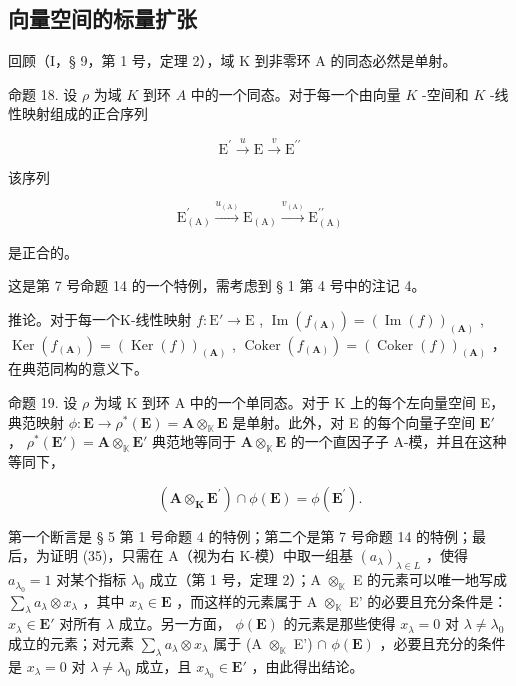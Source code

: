 \subsection{向量空间的标量扩张}

回顾（I，§ 9，第 1 号，定理 2），域 K 到非零环 A 的同态必然是单射。

命题 18. 设 \(\rho\) 为域 \(K\) 到环 \(A\) 中的一个同态。对于每一个由向量 \(K\) -空间和 \(K\) -线性映射组成的正合序列

\[
\mathrm{E} ^ {\prime} \xrightarrow {u} \mathrm{E} \xrightarrow {v} \mathrm{E} ^ {\prime \prime}
\]

该序列

\[
\mathrm{E} _ {(\mathrm{A})} ^ {\prime} \xrightarrow {u _ {(\mathrm{A})}} \mathrm{E} _ {(\mathrm{A})} \xrightarrow {v _ {(\mathrm{A})}} \mathrm{E} _ {(\mathrm{A})} ^ {\prime \prime}
\]

是正合的。

这是第 7 号命题 14 的一个特例，需考虑到 § 1 第 4 号中的注记 4。

推论。对于每一个K-线性映射 \(f: \mathrm{E}' \to \mathrm{E}\) , \(\operatorname{Im}(f_{(\mathbf{A})}) = (\operatorname{Im}(f))_{(\mathbf{A})}\) , \(\operatorname{Ker}(f_{(\mathbf{A})}) = (\operatorname{Ker}(f))_{(\mathbf{A})}\) , \(\operatorname{Coker}(f_{(\mathbf{A})}) = (\operatorname{Coker}(f))_{(\mathbf{A})}\) ，在典范同构的意义下。

命题 19. 设 \(\rho\) 为域 K 到环 A 中的一个单同态。对于 K 上的每个左向量空间 E，典范映射 \(\phi: \mathbf{E} \to \rho^{*}(\mathbf{E}) = \mathbf{A} \otimes_{\mathbb{K}} \mathbf{E}\) 是单射。此外，对 E 的每个向量子空间 \(\mathbf{E}'\) ， \(\rho^{*}(\mathbf{E}') = \mathbf{A} \otimes_{\mathbb{K}} \mathbf{E}'\) 典范地等同于 \(\mathbf{A} \otimes_{\mathbb{K}} \mathbf{E}\) 的一个直因子子 A-模，并且在这种等同下，

\[
(\mathbf {A} \otimes_ {\mathbf {K}} \mathbf {E} ^ {\prime}) \cap \phi (\mathbf {E}) = \phi (\mathbf {E} ^ {\prime}).\tag{35}
\]

第一个断言是 § 5 第 1 号命题 4 的特例；第二个是第 7 号命题 14 的特例；最后，为证明 (35)，只需在 A（视为右 K-模）中取一组基 \((a_{\lambda})_{\lambda \in L}\) ，使得 \(a_{\lambda_0} = 1\) 对某个指标 \(\lambda_0\) 成立（第 1 号，定理 2）；A \(\otimes_{\mathbb{K}}\) E 的元素可以唯一地写成 \(\sum_{\lambda} a_{\lambda} \otimes x_{\lambda}\) ，其中 \(x_{\lambda} \in \mathbf{E}\) ，而这样的元素属于 A \(\otimes_{\mathbb{K}}\) E' 的必要且充分条件是： \(x_{\lambda} \in \mathbf{E}'\) 对所有 \(\lambda\) 成立。另一方面， \(\phi(\mathbf{E})\) 的元素是那些使得 \(x_{\lambda} = 0\) 对 \(\lambda \neq \lambda_0\) 成立的元素；对元素 \(\sum_{\lambda} a_{\lambda} \otimes x_{\lambda}\) 属于 (A \(\otimes_{\mathbb{K}}\) E') \(\cap\) \(\phi(\mathbf{E})\) ，必要且充分的条件是 \(x_{\lambda} = 0\) 对 \(\lambda \neq \lambda_0\) 成立，且 \(x_{\lambda_0} \in \mathbf{E}'\) ，由此得出结论。

